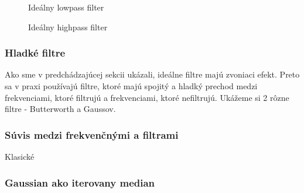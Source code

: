 \begin{figure}[htp]
    \centering
    \caption{Ideálny lowpass filter}
    \label{fig:ideal_lowpass_image}
\end{figure}


\begin{figure}[htp]
    \centering
    \caption{Ideálny highpass filter}
    \label{fig:ideal_highpass_image}
\end{figure}


\subsubsection{Hladké filtre}
Ako sme v predchádzajúcej sekcii ukázali, ideálne filtre majú zvoniaci
efekt. Preto sa v praxi používajú filtre, ktoré majú spojitý a hladký
prechod medzi frekvenciami, ktoré filtrujú a frekvenciami, ktoré
nefiltrujú. Ukážeme si 2 rôzne filtre - Butterworth a Gaussov.



\subsubsection{Súvis medzi frekvenčnými a  filtrami}
Klasické 

\subsubsection{Gaussian ako iterovany median}

